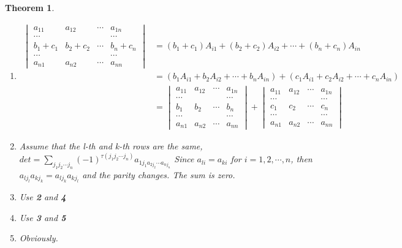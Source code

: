 \documentclass{article}
\newtheorem{theorem}{Theorem}[section]
\theoremstyle{definition}
\begin{document}
\begin{theorem}
\begin{enumerate}
\item
\begin{align*}
\begin{vmatrix}
    a_{11} & a_{12} & \cdots & a_{1n}\\
    \cdots &  &  & \cdots\\
    b_{1}+c_{1} & b_{2}+c_{2} & \cdots & b_{n}+c_{n}\\
    \cdots &  &  & \cdots\\
    a_{n1} & a_{n2} & \cdots & a_{nn}
\end{vmatrix}
& = (b_{1}+c_{1})A_{i1} + (b_{2}+c_{2})A_{i2} + \cdots + (b_{n}+c_{n})A_{in} \\
& = (b_{1}A_{i1} + b_{2}A_{i2} + \cdots + b_{n}A_{in}) + (c_{1}A_{i1} + c_{2}A_{i2} + \cdots + c_{n}A_{in}) \\
& = \begin{vmatrix}
    a_{11} & a_{12} & \cdots & a_{1n}\\
    \cdots &  &  & \cdots\\
    b_{1} & b_{2} & \cdots & b_{n}\\
    \cdots &  &  & \cdots\\
    a_{n1} & a_{n2} & \cdots & a_{nn}
\end{vmatrix}
+ \begin{vmatrix}
    a_{11} & a_{12} & \cdots & a_{1n}\\
    \cdots &  &  & \cdots\\
    c_{1} & c_{2} & \cdots & c_{n}\\
    \cdots &  &  & \cdots\\
    a_{n1} & a_{n2} & \cdots & a_{nn}
\end{vmatrix}
\end{align*}

\item    Assume that the l-th and k-th rows are the same,
$det = \sum_{j_{1}j_{2}\cdots j_{n}}(-1)^{\tau (j_{1}j_{2}\cdots j_{n})}a_{1j_{1}a_{2j_{2}}\cdots a_{nj_{n}}}$
Since $a_{li}=a_{ki}$ for $i=1,2,\cdots,n$, then $a_{lj_{l}}a_{kj_{k}}=a_{lj_{k}}a_{kj_{l}}$ and the parity changes.
The sum is zero.
\item 
Use \textbf{2} and \textbf{4}

\item 
Use \textbf{3} and \textbf{5}

\item Obviously.

\end{enumerate}



\end{theorem}
\end{document}
